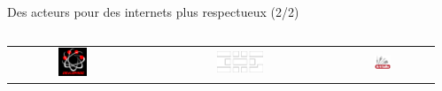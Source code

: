\begin{frame}{Des acteurs pour des internets plus respectueux (2/2)}
\begin{columns}
\begin{column}{0.5\textwidth}
\begin{tabular}{cccc}
        \includegraphics[width=0.24\textwidth]{un_autre_internet/devloprog.png} &
        \includegraphics[width=0.24\textwidth]{un_autre_internet/3hg.png} &
        \includegraphics[width=0.24\textwidth]{un_autre_internet/artifaille.png} \\
      \end{tabular}
    \end{column}
    \begin{column}{0.5\textwidth}
    \begin{center}

\end{center}
\end{column}
\end{columns}
\end{frame}
